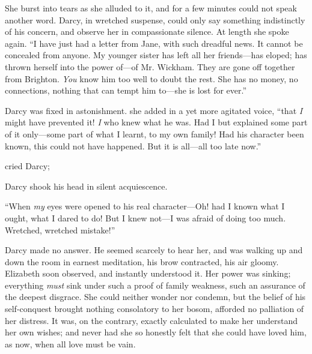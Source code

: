 She burst into tears as she alluded to it, and for a few minutes could not speak another word. Darcy, in wretched suspense, could only say something indistinctly of his concern, and observe her in compassionate silence. At length she spoke again. “I have just had a letter from Jane, with such dreadful news. It cannot be concealed from anyone. My younger sister has left all her friends---has eloped; has thrown herself into the power of---of Mr. Wickham. They are gone off together from Brighton. {\em You} know him too well to doubt the rest. She has no money, no connections, nothing that can tempt him to---she is lost for ever.”

Darcy was fixed in astonishment.  she added in a yet more agitated voice, “that {\em I} might have prevented it! {\em I} who knew what he was. Had I but explained some part of it only---some part of what I learnt, to my own family! Had his character been known, this could not have happened. But it is all---all too late now.”

 cried Darcy; 




Darcy shook his head in silent acquiescence.

“When {\em my} eyes were opened to his real character---Oh! had I known what I ought, what I dared to do! But I knew not---I was afraid of doing too much. Wretched, wretched mistake!”

Darcy made no answer. He seemed scarcely to hear her, and was walking up and down the room in earnest meditation, his brow contracted, his air gloomy. Elizabeth soon observed, and instantly understood it. Her power was sinking; everything {\em must} sink under such a proof of family weakness, such an assurance of the deepest disgrace. She could neither wonder nor condemn, but the belief of his self-conquest brought nothing consolatory to her bosom, afforded no palliation of her distress. It was, on the contrary, exactly calculated to make her understand her own wishes; and never had she so honestly felt that she could have loved him, as now, when all love must be vain.

